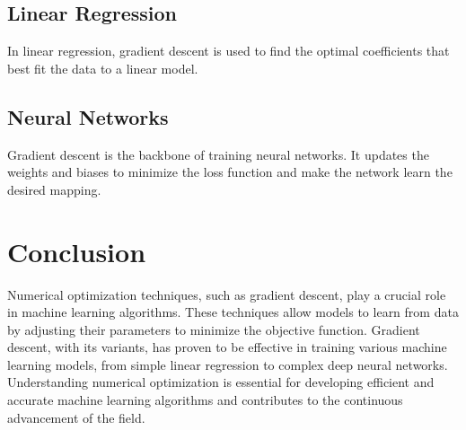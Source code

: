 \documentclass{article}
\begin{document}
\subsection{Linear Regression}
In linear regression, gradient descent is used to find the optimal coefficients that best fit the data to a linear model.

\subsection{Neural Networks}
Gradient descent is the backbone of training neural networks. It updates the weights and biases to minimize the loss function and make the network learn the desired mapping.

\section{Conclusion}
Numerical optimization techniques, such as gradient descent, play a crucial role in machine learning algorithms. These techniques allow models to learn from data by adjusting their parameters to minimize the objective function. Gradient descent, with its variants, has proven to be effective in training various machine learning models, from simple linear regression to complex deep neural networks. Understanding numerical optimization is essential for developing efficient and accurate machine learning algorithms and contributes to the continuous advancement of the field.
\end{document}
